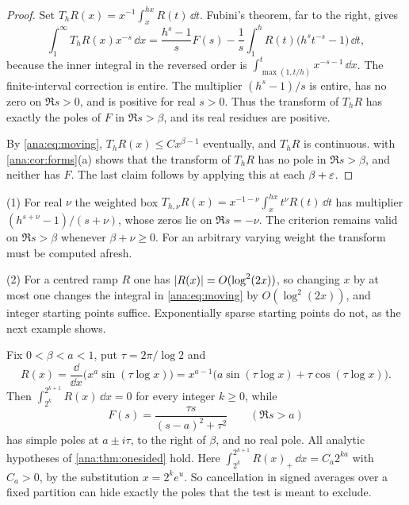 \begin{proof}
Set $T_hR(x)=x^{-1}\int_x^{hx}R(t)\,\dd t$. Fubini's theorem, far to the right, gives
\[
 \int_1^\infty T_hR(x)x^{-s}\,\dd x=\frac{h^s-1}{s}F(s)
 -\frac1s\int_1^hR(t)\bigl(h^st^{-s}-1\bigr)\,\dd t ,
\]
because the inner integral in the reversed order is $\int_{\max(1,t/h)}^tx^{-s-1}\,\dd x$. The
finite-interval correction is entire. The multiplier $(h^s-1)/s$ is entire, has no zero on
$\Re s>0$, and is positive for real $s>0$. Thus the transform of $T_hR$ has exactly the poles of
$F$ in $\Re s>\beta$, and its real residues are positive.

By \eqref{ana:eq:moving}, $T_hR(x)\le Cx^{\beta-1}$ eventually, and $T_hR$ is continuous.
 with \cref{ana:cor:forms}(a) shows that the transform of $T_hR$ has no
pole in $\Re s>\beta$, and neither has $F$. The last claim follows by applying this at each
$\beta+\varepsilon$.
\end{proof}

\begin{remark}\label{ana:rem:box}
(1) For real $\nu$ the weighted box $T_{h,\nu}R(x)=x^{-1-\nu}\int_x^{hx}t^\nu R(t)\,\dd t$ has
multiplier $(h^{s+\nu}-1)/(s+\nu)$, whose zeros lie on $\Re s=-\nu$. The criterion remains valid
on $\Re s>\beta$ whenever $\beta+\nu\ge0$. For an arbitrary varying weight the transform must be
computed afresh.

(2) For a centred ramp $R$ one has $\lvert R(x)\rvert=O(\log^2(2x))$, so changing $x$ by at most one
changes the integral in \eqref{ana:eq:moving} by $O(\log^2(2x))$, and integer starting points
suffice. Exponentially sparse starting points do not, as the next example shows.
\end{remark}

\begin{example}\label{ana:ex:dyadic}
Fix $0<\beta<a<1$, put $\tau=2\pi/\log2$ and
\[
 R(x)=\frac{\dd}{\dd x}\bigl(x^a\sin(\tau\log x)\bigr)
 =x^{a-1}\bigl(a\sin(\tau\log x)+\tau\cos(\tau\log x)\bigr).
\]
Then $\int_{2^k}^{2^{k+1}}R(x)\,\dd x=0$ for every integer $k\ge0$, while
\[
 F(s)=\frac{\tau s}{(s-a)^2+\tau^2}\qquad(\Re s>a)
\]
has simple poles at $a\pm i\tau$, to the right of $\beta$, and no real pole. All analytic
hypotheses of \cref{ana:thm:onesided} hold. Here
$\int_{2^k}^{2^{k+1}}R(x)_+\,\dd x=C_a2^{ka}$ with $C_a>0$, by the substitution $x=2^ke^u$. So
cancellation in signed averages over a fixed partition can hide exactly the poles that the test
is meant to exclude.
\end{example}

